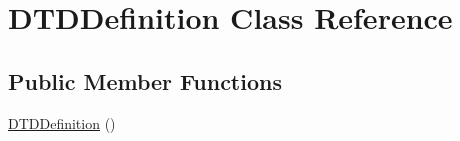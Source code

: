 \hypertarget{class_d_t_d_definition}{\section{\-D\-T\-D\-Definition \-Class \-Reference}
\label{class_d_t_d_definition}
}
\subsection*{\-Public \-Member \-Functions}
\begin{DoxyCompactItemize}
\item 
\hypertarget{class_d_t_d_definition_ac8b5be3c096bbdd9aee6e1f53d7289c0}{\hyperlink{class_d_t_d_definition_ac8b5be3c096bbdd9aee6e1f53d7289c0}{\-D\-T\-D\-Definition} ()}\label{class_d_t_d_definition_ac8b5be3c096bbdd9aee6e1f53d7289c0}


\end{DoxyCompactItemize}
